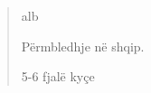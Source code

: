 \begin{abstract}
    \markboth{\abstractname}{}
\begin{scontents}[store-env=lang]
alb
\end{scontents}
\begin{scontents}[store-env=abstracts,print-env=true]
Përmbledhje në shqip.
\end{scontents}

\begin{scontents}[store-env=keywords,print-env=true]
5-6 fjalë kyçe
\end{scontents}
\end{abstract}
\cleardoublepage
{}
